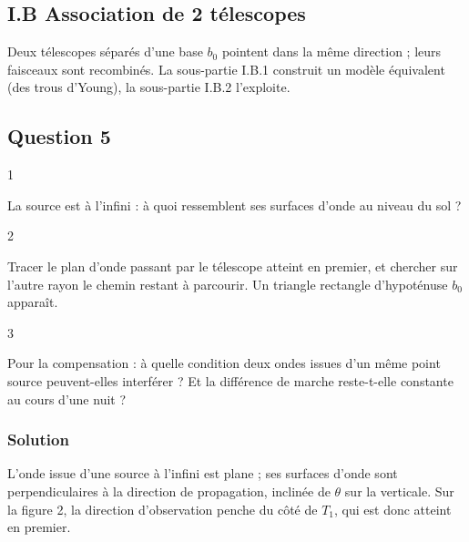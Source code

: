 \documentclass[11pt,a4paper]{article}
\begin{document}
\hypertarget{i.b-association-de-2-tuxe9lescopes}{%
\subsection{I.B Association de 2 télescopes}\label{i.b-association-de-2-tuxe9lescopes}}

Deux télescopes séparés d'une base \(b_0\) pointent dans la même direction ; leurs faisceaux sont recombinés. La sous-partie I.B.1 construit un modèle équivalent (des trous d'Young), la sous-partie I.B.2 l'exploite.

\hypertarget{question-5}{%
\subsection{Question 5}\label{question-5}}

\begin{indication}{1}

La source est à l'infini : à quoi ressemblent ses surfaces d'onde au niveau du sol ?

\end{indication}

\begin{indication}{2}

Tracer le plan d'onde passant par le télescope atteint en premier, et chercher sur l'autre rayon le chemin restant à parcourir. Un triangle rectangle d'hypoténuse \(b_0\) apparaît.

\end{indication}

\begin{indication}{3}

Pour la compensation : à quelle condition deux ondes issues d'un même point source peuvent-elles interférer ? Et la différence de marche reste-t-elle constante au cours d'une nuit ?

\end{indication}

\hypertarget{solution-4}{%
\subsubsection{Solution}\label{solution-4}}

L'onde issue d'une source à l'infini est plane ; ses surfaces d'onde sont perpendiculaires à la direction de propagation, inclinée de \(\theta\) sur la verticale. Sur la figure 2, la direction d'observation penche du côté de \(T_1\), qui est donc atteint en premier.
\end{document}
